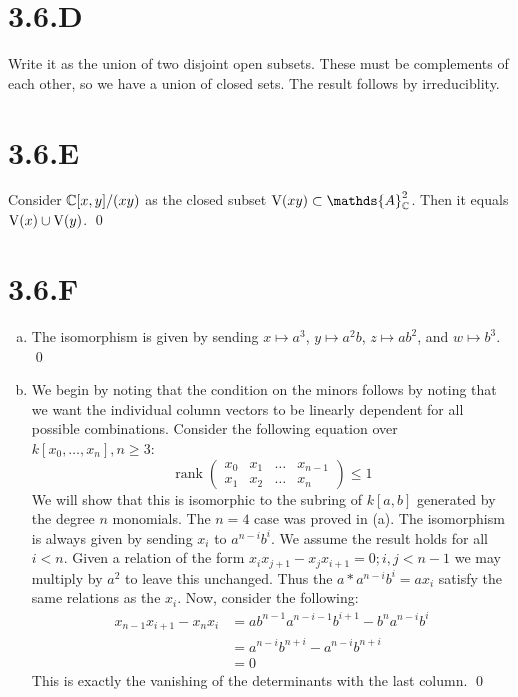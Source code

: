 \documentclass{article}
\begin{document}
\section{3.6.D}
Write it as the union of two disjoint open subsets. These must be complements
of each other, so we have a union of closed sets. The result follows by
irreduciblity.

\section{3.6.E}
Consider $\mathbb{C}[x,y]/(xy)$ as the closed subset $\V(xy) \subset \mathds{A}^2_{\C}$.
Then it equals $\operatorname{V}(x) \cup \operatorname{V}(y)$. \qed

\section{3.6.F}
\begin{enumerate}[a.]
    \item The isomorphism is given by sending $x \mapsto a^3$,
          $y \mapsto a^2b$, $z \mapsto ab^2$, and $w \mapsto b^3$.
          \qed
    \item We begin by noting that the condition on the minors follows by noting that we
          want the individual column vectors to be linearly dependent for all possible
          combinations. Consider the following equation over $k[x_0, \dots, x_n], n \geq 3$:
          \begin{equation*}
              \operatorname{rank}\begin{pmatrix*}
                  x_0 & x_1 & \dots & x_{n-1} \\ x_1 & x_2 & \dots &
                  x_{n}
              \end{pmatrix*} \leq 1
          \end{equation*}
          We will show that this is isomorphic to the subring of $k[a, b]$
          generated by the degree $n$ monomials. The
          $n=4$ case was proved in (a). The isomorphism is always given
          by sending $x_i$ to $a^{n-i}b^i$. We assume the
          result holds for all $i<n$. Given a relation of the form
          $x_ix_{j+1}-x_jx_{i+1}=0; i, j < n-1$ we may multiply by $a^2$ to leave this
          unchanged. Thus the $a*a^{n-i}b^i = ax_i$ satisfy the same relations as the
          $x_i$. Now, consider the following:
          \begin{align*}
              x_{n-1}x_{i+1}-x_nx_i & = ab^{n-1}a^{n-i-1}b^{i+1}-b^na^{n-i}b^i \\
                                    & = a^{n-i}b^{n+i}-a^{n-i}b^{n+i}          \\
                                    & =0
          \end{align*}
          This is exactly the vanishing of the determinants with the last column. \qed
\end{enumerate}
\end{document}
